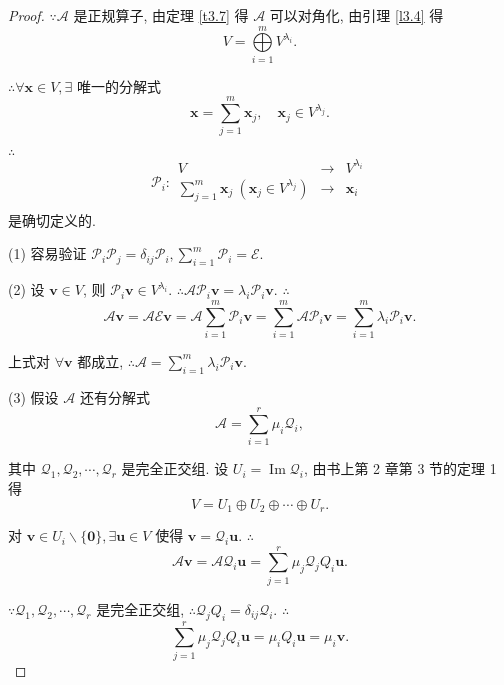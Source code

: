 \documentclass{ctexart}
\begin{document}
\begin{proof}
    $\because\mathcal{A}$ 是正规算子, 由定理 \ref{t3.7} 得 $\mathcal{A}$ 可以对角化, 由引理 \ref{l3.4} 得
    \[V=\bigoplus\limits_{i=1}^mV^{\lambda_i}.\]

    $\therefore\forall\boldsymbol{x}\in V,\exists$ 唯一的分解式
    \[\boldsymbol{x}=\sum\limits_{j=1}^m\boldsymbol{x}_j,\quad\boldsymbol{x}_j\in V^{\lambda_j}.\]

    $\therefore$
    \[\mathcal{P}_i:\begin{array}{rcl}
        V & \to & V^{\lambda_i} \\
        \sum\limits_{j=1}^m\boldsymbol{x}_j\ (\boldsymbol{x}_j\in V^{\lambda_j}) & \to & \boldsymbol{x}_i \\
    \end{array}\]
    是确切定义的.

    (1) 容易验证 $\mathcal{P}_i\mathcal{P}_j=\delta_{ij}\mathcal{P}_i,\sum\limits_{i=1}^m\mathcal{P}_i=\mathcal{E}$.

    (2) 设 $\boldsymbol{v}\in V$, 则 $\mathcal{P}_i\boldsymbol{v}\in V^{\lambda_i}$. $\therefore\mathcal{A}\mathcal{P}_i\boldsymbol{v}=\lambda_i\mathcal{P}_i\boldsymbol{v}$. $\therefore$
    \[\mathcal{A}\boldsymbol{v}=\mathcal{AE}\boldsymbol{v}=\mathcal{A}\sum\limits_{i=1}^m\mathcal{P}_i\boldsymbol{v}=\sum\limits_{i=1}^m\mathcal{A}\mathcal{P}_i\boldsymbol{v}=\sum\limits_{i=1}^m\lambda_i\mathcal{P}_i\boldsymbol{v}.\]

    上式对 $\forall\boldsymbol{v}$ 都成立, $\therefore\mathcal{A}=\sum\limits_{i=1}^m\lambda_i\mathcal{P}_i\boldsymbol{v}$.

    (3) 假设 $\mathcal{A}$ 还有分解式
    \[\mathcal{A}=\sum\limits_{i=1}^r\mu_i\mathcal{Q}_i,\]

    其中 $\mathcal{Q}_1,\mathcal{Q}_2,\cdots,\mathcal{Q}_r$ 是完全正交组. 设 $U_i=\operatorname{Im}\mathcal{Q}_i$, 由书上第 2 章第 3 节的定理 1 得
    \begin{equation}\label{eq3.5}
        V=U_1\oplus U_2\oplus\cdots\oplus U_r.
    \end{equation}

    对 $\boldsymbol{v}\in U_i\backslash\{\boldsymbol{0}\},\exists\boldsymbol{u}\in V$ 使得 $\boldsymbol{v}=\mathcal{Q}_i\boldsymbol{u}$. $\therefore$
    \[\mathcal{A}\boldsymbol{v}=\mathcal{AQ}_i\boldsymbol{u}=\sum\limits_{j=1}^r\mu_j\mathcal{Q}_j{Q}_i\boldsymbol{u}.\]

    $\because\mathcal{Q}_1,\mathcal{Q}_2,\cdots,\mathcal{Q}_r$ 是完全正交组, $\therefore\mathcal{Q}_j{Q}_i=\delta_{ij}\mathcal{Q}_i$. $\therefore$
    \[\sum\limits_{j=1}^r\mu_j\mathcal{Q}_j{Q}_i\boldsymbol{u}=\mu_i{Q}_i\boldsymbol{u}=\mu_i\boldsymbol{v}.\]


\end{proof}
\end{document}
